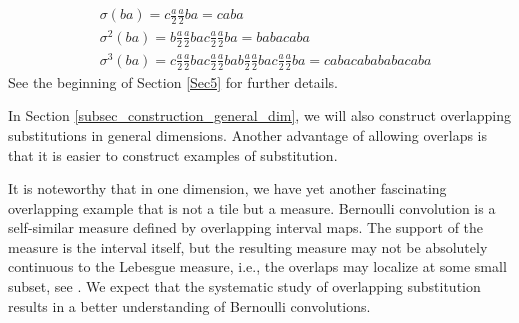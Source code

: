 \documentclass[a4]{amsart}
\theoremstyle{definition}
\begin{document}
\begin{align*}
    &\sigma(ba)=c\frac{a}{2}\frac{a}{2}ba=caba\\
    &\sigma^2(ba)=b\frac{a}{2}\frac{a}{2}bac\frac{a}{2}\frac{a}{2}ba=babacaba\\
    &\sigma^3(ba)=c\frac{a}{2}\frac{a}{2}bac\frac{a}{2}\frac{a}{2}bab\frac{a}{2}\frac{a}{2}bac\frac{a}{2}\frac{a}{2}ba=cabacabababacaba
\end{align*}
See the beginning of Section \ref{Sec5} for further details.

In Section \ref{subsec_construction_general_dim}, we will also construct overlapping substitutions in general dimensions. Another advantage of allowing overlaps is that
it is easier to construct examples of substitution.

It is noteworthy that in one dimension, we have yet another fascinating overlapping example that is not a tile but a measure.
Bernoulli convolution is a self-similar measure defined by overlapping interval maps. The support of the measure is the interval itself, but the resulting measure may not be absolutely continuous to the Lebesgue measure, i.e., the overlaps may localize at some small subset, see \cite{PSS}.
We expect that the systematic study of overlapping substitution results in a better understanding of Bernoulli convolutions.

\end{document}
